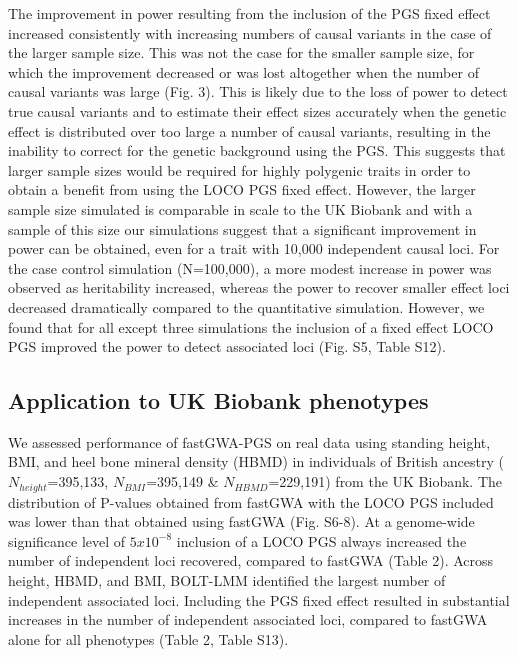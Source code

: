 \documentclass[fleqn,10pt]{wlscirep}
\begin{document}
The improvement in power resulting from the inclusion of the PGS fixed effect increased consistently with increasing numbers of causal variants in the case of the larger sample size. This was not the case for the smaller sample size, for which the improvement decreased or was lost altogether when the number of causal variants was large (Fig. 3). This is likely due to the loss of power to detect true causal variants and to estimate their effect sizes accurately when the genetic effect is distributed over too large a number of causal variants, resulting in the inability to correct for the genetic background using the PGS. This suggests that larger sample sizes would be required for highly polygenic traits in order to obtain a benefit from using the LOCO PGS fixed effect. However, the larger sample size simulated is comparable in scale to the UK Biobank and with a sample of this size our simulations suggest that a significant improvement in power can be  obtained, even for a trait with 10,000 independent causal loci. For the case control simulation (N=100,000), a more modest increase in power was observed as heritability increased, whereas the power to recover smaller effect loci decreased dramatically compared to the quantitative simulation. However, we found that for all except three simulations the inclusion of a fixed effect LOCO PGS improved the power to detect associated loci (Fig. S5, Table S12). \par



\subsection*{Application to UK Biobank phenotypes} 

We assessed performance of fastGWA-PGS on real data using standing height, BMI, and heel bone mineral density (HBMD) in individuals of British ancestry ($N_{height}$=395,133, $N_{BMI}$=395,149 \& $N_{HBMD}$=229,191) from the UK Biobank. The distribution of P-values obtained from fastGWA with the LOCO PGS included was lower than that obtained using fastGWA (Fig. S6-8). At a genome-wide significance level of $5x10^{-8}$ inclusion of a LOCO PGS always increased the number of independent loci recovered, compared to fastGWA (Table 2). Across height, HBMD, and BMI, BOLT-LMM identified the largest number of independent associated loci. Including the PGS fixed effect resulted in substantial increases in the number of independent associated loci, compared to fastGWA alone for all phenotypes (Table 2, Table S13).
\end{document}
